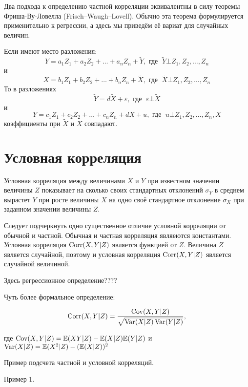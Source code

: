 \documentclass[10pt]{article}
\begin{document}
Два подхода к определению частной корреляции эквивалентны в силу теоремы Фриша-Ву-Ловелла (Frisch–Waugh–Lovell). Обычно эта теорема формулируется применительно к регрессии, а здесь мы приведём её вариат для случайных величин.

\begin{theorem}
Если имеют место разложения:
\[
Y=a_1 Z_1 + a_2 Z_2 + \ldots + a_n Z_n + \tilde{Y}, \text{ где }\; \tilde{Y}\bot Z_1, Z_2, \ldots, Z_n
\]
и
\[
X=b_1 Z_1 + b_2 Z_2 + \ldots + b_n Z_n  + \tilde{X}, \text{ где }\; \tilde{X}\bot Z_1, Z_2, \ldots, Z_n
\]
То в разложениях  
\[
\tilde{Y}=d \tilde{X} + \varepsilon, \text{ где }\; \varepsilon \bot \tilde{X}
\]
и
\[
Y=c_1 Z_1 + c_2 Z_2 + \ldots + c_n Z_n  + dX + u, \text{ где }\; u \bot Z_1, Z_2, \ldots, Z_n, X
\]
коэффициенты при $\tilde{X}$ и $X$ совпадают.
\end{theorem}



\section{Условная корреляция}

\begin{definition}
Условная корреляция между величинами $X$ и $Y$ при известном значении величины $Z$ показывает на сколько своих стандартных отклонений $\sigma_Y$ в среднем вырастет $Y$ при росте величины $X$ на одно своё стандартное отклонение $\sigma_X$ при заданном значении величины $Z$.
\end{definition}


Следует подчеркнуть одно существенное отличие условной корреляции от обычной и частной. Обычная и частная корреляция являеются константами. Условная корреляция $\operatorname{Corr}(X,Y|Z)$ является функцией от $Z$. Величина $Z$ является случайной, поэтому и условная корреляция $\operatorname{Corr}(X,Y|Z)$ является случайной величиной. 

Здесь регрессионное определение???? 

Чуть более формальное определение:

\begin{definition}
\[
\operatorname{Corr}(X,Y|Z) = \frac{\operatorname{Cov}(X,Y|Z)}{\sqrt{\operatorname{Var}(X|Z)\operatorname{Var}(Y|Z)}},
\]
\end{definition}

где $\operatorname{Cov}(X,Y|Z)=\mathbb{E}(XY|Z)-\mathbb{E}(X|Z)\mathbb{E}(Y|Z)$ и $\operatorname{Var}(X|Z)=\mathbb{E}(X^2|Z)-(\mathbb{E}(X|Z))^2$


Пример подсчета частной и условной корреляций.

Пример 1.
\end{document}
